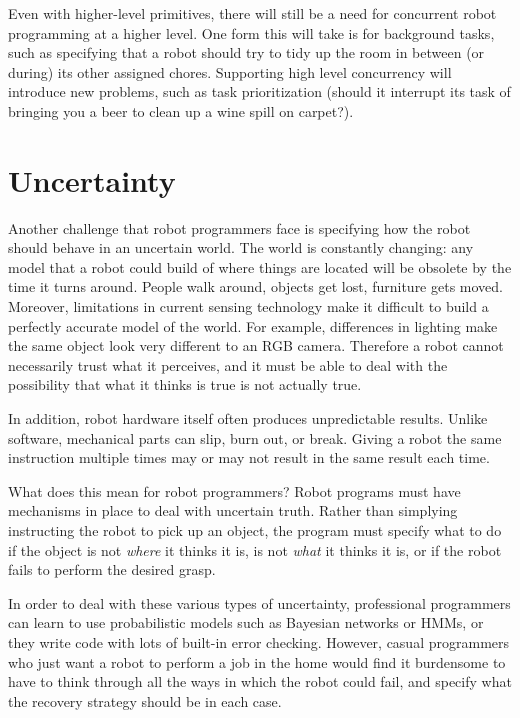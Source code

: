 \documentclass{article}
\begin{document}
Even with higher-level primitives, there will still be a need for concurrent robot programming at a higher level. One form this will take is for background tasks, such as specifying that a robot should try to tidy up the room in between (or during) its other assigned chores. Supporting high level concurrency will introduce new problems, such as task prioritization (should it interrupt its task of bringing you a beer to clean up a wine spill on carpet?).

\section{Uncertainty}


Another challenge that robot programmers face is specifying how the robot should behave in an uncertain world. The world is constantly changing: any model that a robot could build of where things are located will be obsolete by the time it turns around. People walk around, objects get lost, furniture gets moved. Moreover, limitations in current sensing technology make it difficult to build a perfectly accurate model of the world. For example, differences in lighting make the same object look very different to an RGB camera. Therefore a robot cannot necessarily trust what it perceives, and it must be able to deal with the possibility that what it thinks is true is not actually true.

In addition, robot hardware itself often produces unpredictable results. Unlike software, mechanical parts can slip, burn out, or break. Giving a robot the same instruction multiple times may or may not result in the same result each time.

What does this mean for robot programmers? Robot programs must have mechanisms in place to deal with uncertain truth. Rather than simplying instructing the robot to pick up an object, the program must specify what to do if the object is not {\em where} it thinks it is, is not {\em what} it thinks it is, or if the robot fails to perform the desired grasp.

In order to deal with these various types of uncertainty, professional programmers can learn to use probabilistic models such as Bayesian networks or HMMs, or they write code with lots of built-in error checking. However, casual programmers who just want a robot to perform a job in the home would find it burdensome to have to think through all the ways in which the robot could fail, and specify what the recovery strategy should be in each case.
\end{document}
